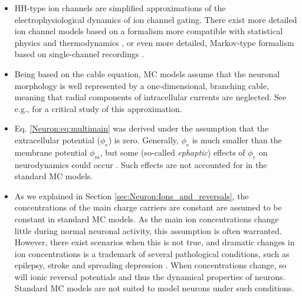 \begin{itemize}
\item HH-type ion channels are simplified approximations of the electrophysiological dynamics of ion channel gating. There exist more detailed ion channel models based on a formalism more compatible with statistical physics and thermodynamics \cite{destexhe2010}, or even more detailed, Markov-type formalism based on single-channel recordings \cite{sakmann2013}.

\item Being based on the cable equation, MC models assume that the neuronal morphology is well represented by a one-dimensional, branching cable, meaning that radial components of intracellular currents are neglected. See e.g.,\cite{lindsay2004maxwell} for a critical study of this approximation.

\item Eq. \ref{Neuron:eq:multimain} was derived under the assumption that the extracellular potential ($\phi_e$) is zero. Generally, $\phi_e$ is much smaller than the membrane potential $\phi_m$, but some (so-called \textit{ephaptic}) effects  of $\phi_e$ on neurodynamics could occur \cite{Holt1999,anastassiou2015,Tveito2017}. Such effects are not accounted for in the standard MC models.

\item As we explained in Section \ref{sec:Neuron:Ions_and_reversals}, the concentrations of the main charge carriers are constant are assumed to be constant in standard MC models. As the main ion concentrations change little during normal neuronal activity, this assumption is often warranted. However, there exist scenarios when this is not true, and dramatic changes in ion concentrations is a trademark of several pathological conditions, such as epilepsy, stroke and spreading depression \cite{Somjen2001,Zandt2015,Ayata2015}. When concentrations change, so will ionic reversal potentials and thus the dynamical properties of neurons. Standard MC models are not suited to model neurons under such conditions.

\end{itemize}

